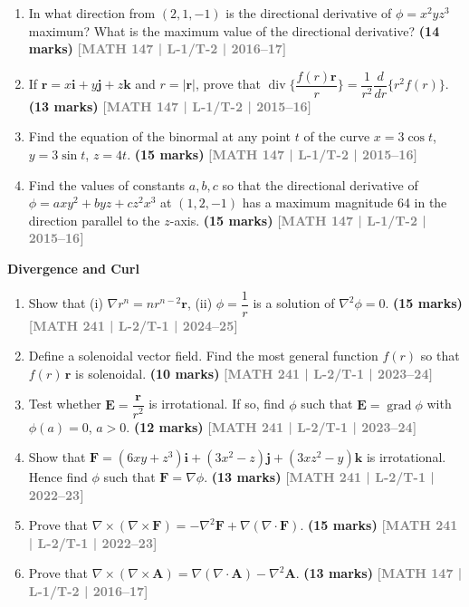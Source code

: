 \documentclass[12pt,a4paper]{article}
\newcommand{\yr}[1]{\hfill\textcolor{gray}{\small\textbf{[#1]}}}
\newcommand{\mk}[1]{\textcolor{orange!70!black}{\small\textbf{(#1 marks)}}}
\newcommand{\subtopic}[2]{%
  \vspace{10pt}
  \noindent\begin{tcolorbox}[colback=#1!8,colframe=#1,boxrule=0.6pt,arc=4pt,
    left=6pt,right=6pt,top=4pt,bottom=4pt]
    \small\bfseries\textcolor{#1}{#2}
  \end{tcolorbox}
  \vspace{2pt}
}
\begin{document}
\begin{enumerate}
\item In what direction from $(2,1,-1)$ is the directional derivative of $\phi=x^{2}yz^{3}$ maximum? What is the maximum value of the directional derivative?
\mk{14} \yr{MATH 147 | L-1/T-2 | 2016--17}

\item If $\mathbf{r}=x\mathbf{i}+y\mathbf{j}+z\mathbf{k}$ and $r=|\mathbf{r}|$, prove that $\operatorname{div}\{\dfrac{f(r)\mathbf{r}}{r}\}=\dfrac{1}{r^{2}}\dfrac{d}{dr}\{r^{2}f(r)\}$.
\mk{13} \yr{MATH 147 | L-1/T-2 | 2015--16}

\item Find the equation of the binormal at any point $t$ of the curve $x=3\cos t$, $y=3\sin t$, $z=4t$.
\mk{15} \yr{MATH 147 | L-1/T-2 | 2015--16}

\item Find the values of constants $a,b,c$ so that the directional derivative of $\phi=axy^{2}+byz+cz^{2}x^{3}$ at $(1,2,-1)$ has a maximum magnitude 64 in the direction parallel to the $z$-axis.
\mk{15} \yr{MATH 147 | L-1/T-2 | 2015--16}

\end{enumerate}

\subtopic{cD}{Divergence and Curl}
\label{sub:s4-divcurl}

\begin{enumerate}\item Show that (i) $\nabla r^{n}=nr^{n-2}\mathbf{r}$, (ii) $\phi=\dfrac{1}{r}$ is a solution of $\nabla^{2}\phi=0$.
\mk{15} \yr{MATH 241 | L-2/T-1 | 2024--25}

\item Define a solenoidal vector field. Find the most general function $f(r)$ so that $f(r)\,\mathbf{r}$ is solenoidal.
\mk{10} \yr{MATH 241 | L-2/T-1 | 2023--24}

\item Test whether $\mathbf{E}=\dfrac{\mathbf{r}}{r^{2}}$ is irrotational. If so, find $\phi$ such that $\mathbf{E}=\operatorname{grad}\phi$ with $\phi(a)=0$, $a>0$.
\mk{12} \yr{MATH 241 | L-2/T-1 | 2023--24}

\item Show that $\mathbf{F}=(6xy+z^{3})\mathbf{i}+(3x^{2}-z)\mathbf{j}+(3xz^{2}-y)\mathbf{k}$ is irrotational. Hence find $\phi$ such that $\mathbf{F}=\nabla\phi$.
\mk{13} \yr{MATH 241 | L-2/T-1 | 2022--23}

\item Prove that $\nabla\times(\nabla\times\mathbf{F})=-\nabla^{2}\mathbf{F}+\nabla(\nabla\cdot\mathbf{F})$.
\mk{15} \yr{MATH 241 | L-2/T-1 | 2022--23}

\item Prove that $\nabla\times(\nabla\times\mathbf{A})=\nabla(\nabla\cdot\mathbf{A})-\nabla^{2}\mathbf{A}$.
\mk{13} \yr{MATH 147 | L-1/T-2 | 2016--17}

\end{enumerate}
\end{document}
